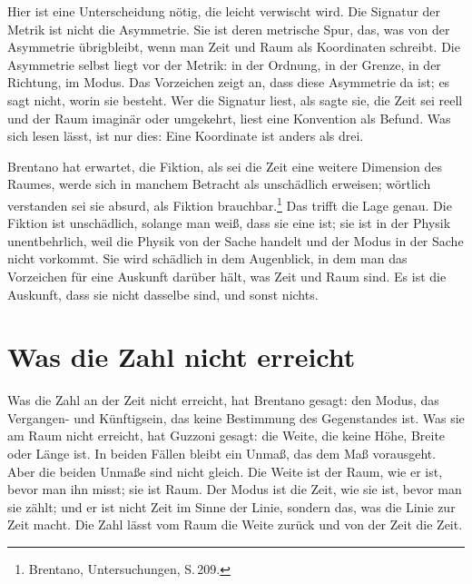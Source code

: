 Hier ist eine Unterscheidung nötig, die leicht verwischt wird. Die Signatur der Metrik ist nicht die Asymmetrie. Sie ist deren metrische Spur, das, was von der Asymmetrie übrigbleibt, wenn man Zeit und Raum als Koordinaten schreibt. Die Asymmetrie selbst liegt vor der Metrik: in der Ordnung, in der Grenze, in der Richtung, im Modus. Das Vorzeichen zeigt an, dass diese Asymmetrie da ist; es sagt nicht, worin sie besteht. Wer die Signatur liest, als sagte sie, die Zeit sei reell und der Raum imaginär oder umgekehrt, liest eine Konvention als Befund. Was sich lesen lässt, ist nur dies: Eine Koordinate ist anders als drei.

Brentano hat erwartet, die Fiktion, als sei die Zeit eine weitere Dimension des Raumes, werde sich in manchem Betracht als unschädlich erweisen; wörtlich verstanden sei sie absurd, als Fiktion brauchbar.\footnote{Brentano, Untersuchungen, S.\,209.} Das trifft die Lage genau. Die Fiktion ist unschädlich, solange man weiß, dass sie eine ist; sie ist in der Physik unentbehrlich, weil die Physik von der Sache handelt und der Modus in der Sache nicht vorkommt. Sie wird schädlich in dem Augenblick, in dem man das Vorzeichen für eine Auskunft darüber hält, was Zeit und Raum sind. Es ist die Auskunft, dass sie nicht dasselbe sind, und sonst nichts.

\section{Was die Zahl nicht erreicht}

Was die Zahl an der Zeit nicht erreicht, hat Brentano gesagt: den Modus, das Vergangen- und Künftigsein, das keine Bestimmung des Gegenstandes ist. Was sie am Raum nicht erreicht, hat Guzzoni gesagt: die Weite, die keine Höhe, Breite oder Länge ist. In beiden Fällen bleibt ein Unmaß, das dem Maß vorausgeht. Aber die beiden Unmaße sind nicht gleich. Die Weite ist der Raum, wie er ist, bevor man ihn misst; sie ist Raum. Der Modus ist die Zeit, wie sie ist, bevor man sie zählt; und er ist nicht Zeit im Sinne der Linie, sondern das, was die Linie zur Zeit macht. Die Zahl lässt vom Raum die Weite zurück und von der Zeit die Zeit.
